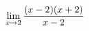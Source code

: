 \documentclass[preview]{standalone}
\begin{document}
\begin{align*}
\special{dvisvgm:raw <g id='unique000'>}\lim_{x \to 2} \frac{(x-2)(x+2)}{x - 2}\special{dvisvgm:raw </g>}
\end{align*}
\end{document}
